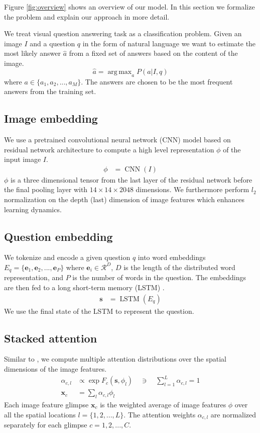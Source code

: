 \documentclass[10pt,twocolumn,letterpaper]{article}
\DeclareMathOperator*{\argmax}{arg\,max}
\DeclareMathOperator*{\CNN}{CNN}
\DeclareMathOperator*{\LSTM}{LSTM}
\begin{document}
Figure \ref{fig:overview} shows an overview of our model. In this section we formalize the problem and explain our approach in more detail.

We treat visual question answering task as a classification problem. Given an image $I$ and a question $q$ in the form of natural language we want to estimate the most likely answer $\hat{a}$ from a fixed set of answers  based on the content of the image.
\begin{equation}
\hat{a} = \argmax_a P(a|I, q)
\end{equation}
where $a \in \{a_1, a_2, ..., a_M\}$. The answers are chosen to be the most frequent answers from the training set.

\subsection{Image embedding}
We use a pretrained convolutional neural network (CNN) model based on residual network architecture \cite{Krizhevsky2012ImageNetCW} to compute a high level representation $\phi$ of the input image $I$.
\begin{align}
\phi &= \CNN(I)
\end{align}
$\phi$ is a three dimensional tensor from the last layer of the residual network \cite{He2016DeepRL} before the final pooling layer with $14 \times 14 \times 2048$ dimensions. We furthermore perform $l_2$ normalization on the depth (last) dimension of image features which enhances learning dynamics.

\subsection{Question embedding}
We tokenize and encode a given question $q$ into word embeddings $E_q = \{\mathbf{e}_1, \mathbf{e}_2, ..., \mathbf{e}_P\}$ where $\mathbf{e}_i \in \mathcal{R}^D$, $D$ is the length of the distributed word representation, and $P$ is the number of words in the question. The embeddings are then fed to a long short-term memory (LSTM) \cite{Hochreiter1997LongSM}.
\begin{align}
\mathbf{s} &= \LSTM(E_q)
\end{align}
We use the final state of the LSTM to represent the question. 

\subsection{Stacked  attention}
Similar to \cite{Yang2016StackedAN}, we compute multiple attention distributions over the spatial dimensions of the image features.
\begin{align}
\alpha_{c,l} &\propto \exp F_c(\mathbf{s}, \phi_l)  \quad\ni\quad  \sum_{l=1}^L\alpha_{c, l}=1 \\
\mathbf{x}_c &= \sum_l \alpha_{c, l} \phi_l
\end{align}
Each image feature glimpse $\mathbf{x}_c$ is the weighted average of image features $\phi$ over all the spatial locations $l=\{1, 2, ..., L\}$. The attention weights $\alpha_{c, l}$ are normalized separately for each glimpse $c = 1, 2,..., C$. 
\end{document}
